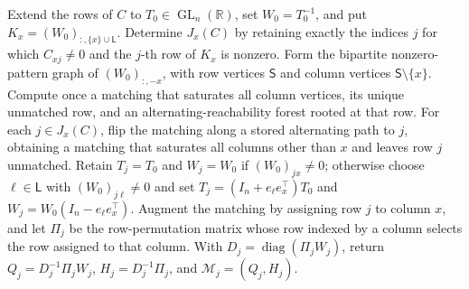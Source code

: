 Extend the rows of \(C\) to \(T_0\in\operatorname{GL}_n(\mathbb R)\), set \(W_0=T_0^{-1}\), and put \(K_x=(W_0)_{:,\{x\}\cup\mathsf L}\). Determine \(J_x(C)\) by retaining exactly the indices \(j\) for which \(C_{xj}\ne0\) and the \(j\)-th row of \(K_x\) is nonzero. Form the bipartite nonzero-pattern graph of \((W_0)_{:, -x}\), with row vertices \(\mathsf S\) and column vertices \(\mathsf S\setminus\{x\}\). Compute once a matching that saturates all column vertices, its unique unmatched row, and an alternating-reachability forest rooted at that row. For each \(j\in J_x(C)\), flip the matching along a stored alternating path to \(j\), obtaining a matching that saturates all columns other than \(x\) and leaves row \(j\) unmatched. Retain \(T_j=T_0\) and \(W_j=W_0\) if \((W_0)_{jx}\ne0\); otherwise choose \(\ell\in\mathsf L\) with \((W_0)_{j\ell}\ne0\) and set \(T_j=(I_n+e_\ell e_x^\top)T_0\) and \(W_j=W_0(I_n-e_\ell e_x^\top)\). Augment the matching by assigning row \(j\) to column \(x\), and let \(\Pi_j\) be the row-permutation matrix whose row indexed by a column selects the row assigned to that column. With \(D_j=\operatorname{diag}(\Pi_jW_j)\), return \(Q_j=D_j^{-1}\Pi_jW_j\), \(H_j=D_j^{-1}\Pi_j\), and \(\mathcal M_j=(Q_j,H_j)\).